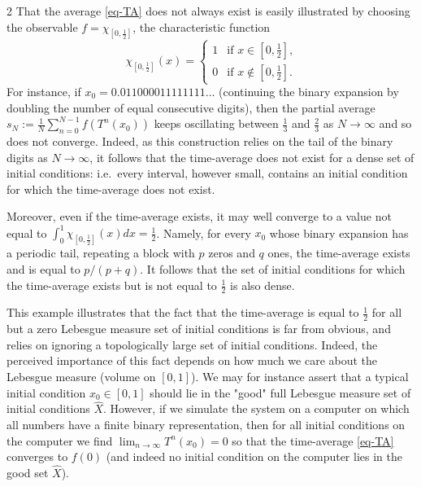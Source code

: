 \documentclass[11pt]{article}
\begin{document}
\begin{multicols}{2}
That the average \eqref{eq-TA} does not always exist is easily illustrated by choosing the observable
$f=\chi_{[0,\frac{1}{2}]}$, the characteristic function 
\[
\chi_{[0,\frac{1}{2}]}(x)=\left\{\begin{array}{ll} 1&\mbox{if $x\in [0,\frac{1}{2}]$,}\\
0&\mbox{if $x\not\in [0,\frac{1}{2}]$.}
\end{array}\right.
\]
For instance, if $x_0=0.011000011111111\ldots$ (continuing the binary expansion by doubling the number of equal consecutive digits), then the partial average
$s_N:=\frac{1}{N}\sum_{n=0}^{N-1} f(T^n(x_0))$ keeps oscillating between $\frac{1}{3}$ and $\frac{2}{3}$ as $N\to\infty$ and so does not converge. Indeed, as this construction relies on the tail of the binary digits as $N\to\infty$, it follows that the time-average does not exist for a dense set of initial conditions: i.e.\ every interval, however small, contains an initial condition for which the time-average does not exist.

Moreover, even if the time-average exists, it may well converge to a value not equal to $\int_0^1\chi_{[0,\frac{1}{2}]}(x)dx=\frac{1}{2}$. Namely, for every $x_0$ whose binary expansion has a periodic tail, repeating a block with $p$ zeros and $q$ ones, the time-average exists and is equal to $p/(p+q)$. It follows that the set of initial conditions for which the time-average exists but is not equal to $\frac{1}{2}$ is also dense.

This example illustrates that the fact that the time-average is equal to $\frac{1}{2}$ for all but a zero Lebesgue measure set of initial conditions is far from obvious, and relies on ignoring a topologically large set of initial conditions. 
Indeed, the perceived importance of this fact depends on how much we care about the Lebesgue measure (volume on $[0,1]$). We may for instance assert that a typical initial condition $x_0\in[0,1]$ should lie in the "good" full Lebesgue measure set of initial conditions $\hat{X}$. However, if we simulate the system on a computer on which all numbers have a finite binary representation, then for all initial conditions on the computer we find $\lim_{n\to\infty} T^n(x_0)=0$ so that the time-average \eqref{eq-TA} converges to $f(0)$ (and indeed no initial condition on the computer lies in the good set $\hat{X}$).


\end{multicols}
\end{document}
